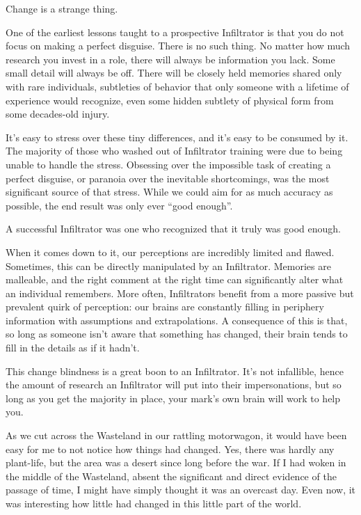Change is a strange thing.

One of the earliest lessons taught to a prospective Infiltrator is that you do not focus on making a perfect disguise. There is no such thing. No matter how much research you invest in a role, there will always be information you lack. Some small detail will always be off. There will be closely held memories shared only with rare individuals, subtleties of behavior that only someone with a lifetime of experience would recognize, even some hidden subtlety of physical form from some decades-old injury.

It’s easy to stress over these tiny differences, and it’s easy to be consumed by it. The majority of those who washed out of Infiltrator training were due to being unable to handle the stress. Obsessing over the impossible task of creating a perfect disguise, or paranoia over the inevitable shortcomings, was the most significant source of that stress. While we could aim for as much accuracy as possible, the end result was only ever “good enough”.

A successful Infiltrator was one who recognized that it truly was good enough.

When it comes down to it, our perceptions are incredibly limited and flawed. Sometimes, this can be directly manipulated by an Infiltrator. Memories are malleable, and the right comment at the right time can significantly alter what an individual remembers. More often, Infiltrators benefit from a more passive but prevalent quirk of perception: our brains are constantly filling in periphery information with assumptions and extrapolations. A consequence of this is that, so long as someone isn’t aware that something has changed, their brain tends to fill in the details as if it hadn’t.

This change blindness is a great boon to an Infiltrator. It’s not infallible, hence the amount of research an Infiltrator will put into their impersonations, but so long as you get the majority in place, your mark’s own brain will work to help you.

As we cut across the Wasteland in our rattling motorwagon, it would have been easy for me to not notice how things had changed. Yes, there was hardly any plant-life, but the area was a desert since long before the war. If I had woken in the middle of the Wasteland, absent the significant and direct evidence of the passage of time, I might have simply thought it was an overcast day. Even now, it was interesting how little had changed in this little part of the world.

